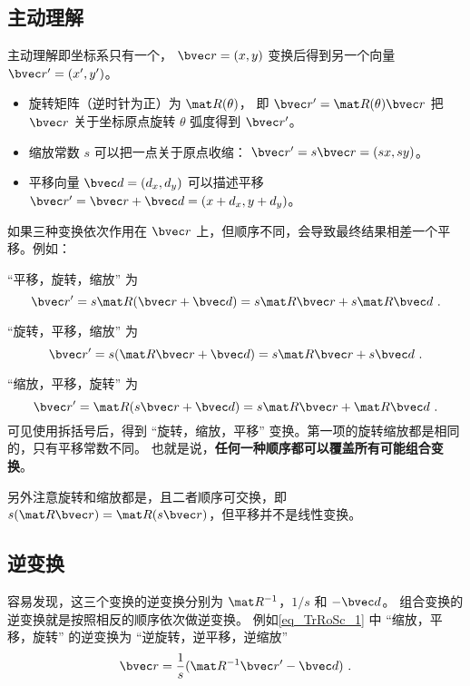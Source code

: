 

\subsection{主动理解}
主动理解即坐标系只有一个， $\bvec r = (x, y)$ 变换后得到另一个向量 $\bvec r' = (x',y')$。

\begin{itemize}
\item 旋转矩阵（逆时针为正）为 $\mat R(\theta)$， 即 $\bvec r' = \mat R(\theta)\bvec r$ 把 $\bvec r$ 关于坐标原点旋转 $\theta$ 弧度得到 $\bvec r'$。
\item 缩放常数 $s$ 可以把一点关于原点收缩： $\bvec r' = s\bvec r = (sx, sy)$。
\item 平移向量 $\bvec d = (d_x,d_y)$ 可以描述平移 $\bvec r' = \bvec r + \bvec d = (x+d_x,y+d_y)$。
\end{itemize}

如果三种变换依次作用在 $\bvec r$ 上，但顺序不同，会导致最终结果相差一个平移。例如：

“平移，旋转，缩放” 为
\begin{equation}
\bvec r' = s\mat R (\bvec r + \bvec d) = s\mat R\bvec r + s\mat R\bvec d~.
\end{equation}

“旋转，平移，缩放” 为
\begin{equation}
\bvec r' = s(\mat R\bvec r + \bvec d) = s\mat R\bvec r + s\bvec d~.
\end{equation}

“缩放，平移，旋转” 为
\begin{equation}\label{eq_TrRoSc_1}
\bvec r' = \mat R(s\bvec r + \bvec d) = s\mat R\bvec r + \mat R\bvec d~.
\end{equation}
可见使用拆括号后，得到 “旋转，缩放，平移” 变换。第一项的旋转缩放都是相同的，只有平移常数不同。 也就是说，\textbf{任何一种顺序都可以覆盖所有可能组合变换}。

另外注意旋转和缩放都是，且二者顺序可交换，即 $s(\mat R\bvec r) = \mat R (s \bvec r)$，但平移并不是线性变换。

\subsection{逆变换}
容易发现，这三个变换的逆变换分别为 $\mat R^{-1}$，$1/s$ 和 $-\bvec d$。 组合变换的逆变换就是按照相反的顺序依次做逆变换。 例如\autoref{eq_TrRoSc_1} 中 “缩放，平移，旋转” 的逆变换为 “逆旋转，逆平移，逆缩放”
\begin{equation}
\bvec r= \frac1s (\mat R^{-1}\bvec r' - \bvec d)~.
\end{equation}

